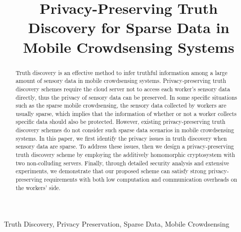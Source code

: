 \documentclass[conference]{IEEEtran}
\begin{document}
\title{Privacy-Preserving Truth Discovery for Sparse Data in Mobile Crowdsensing Systems\\
}

\author{
}
\maketitle

\begin{abstract}
Truth discovery is an effective method to infer truthful information among a large amount of sensory data in mobile crowdsensing systems.
Privacy-preserving truth discovery schemes require the cloud server not to access each worker's sensory data directly, thus the privacy of sensory data can be preserved.
In some specific situations such as the sparse mobile crowdsensing, the sensory data collected by workers are usually sparse, which implies that the information of whether or not a worker collects specific data should also be protected.
However, existing privacy-preserving truth discovery schemes do not consider such sparse data scenarios in mobile crowdsensing systems.
In this paper, we first identify the privacy issues in truth discovery when sensory data are sparse.
To address these issues, then we design a privacy-preserving truth discovery scheme by employing the additively homomorphic cryptosystem with two non-colluding servers.
Finally, through detailed security analysis and extensive experiments, we demonstrate that our proposed scheme can satisfy strong privacy-preserving requirements with both low computation and communication overheads on the workers' side.
\end{abstract}
\begin{IEEEkeywords}
Truth Discovery, Privacy Preservation, Sparse Data, Mobile Crowdsensing
\end{IEEEkeywords}
\end{document}
